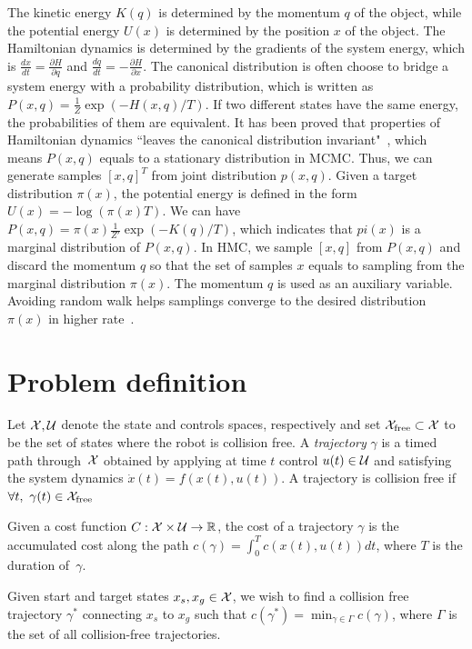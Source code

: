 \documentclass[letterpaper, 10 pt, conference]{ieeeconf}  %
\begin{document}
{The kinetic energy $ K(q) $ is determined by the momentum $ q $ of the object, while the potential energy $ U(x) $ is determined by the position $ x $ of the object.
The Hamiltonian dynamics is determined by the gradients of the system energy, which is
$ \frac{dx}{dt} = \frac{\partial H}{\partial q} $ and $ \frac{dq}{dt} = - \frac{\partial H}{\partial x} $.
%
The canonical distribution is often choose to bridge a system energy with a probability distribution, which is written as $ P(x, q) = \frac{1}{Z} \exp ( -H(x,q) / T ) $.
If two different states have the same energy, the probabilities of them are equivalent.
It has been proved that properties of Hamiltonian dynamics ``leaves the canonical distribution invariant"~\cite{N11}, which means $ P(x, q) $ equals to a stationary distribution in MCMC.
Thus, we can generate samples $ [ x , q ]^T $ from joint distribution $ p(x, q) $.
%
Given a target distribution $ \pi(x) $, the potential energy is defined in the form $  U(x) = - \log ( \pi(x) T ) $.
We can have $ P(x, q) = \pi(x) \frac{1}{Z'} \exp ( -K(q) / T ) $, which indicates that $ pi(x) $ is a marginal distribution of $ P(x, q) $.
In HMC, we sample $ [ x ,q ] $ from $ P(x, q) $ and discard the momentum $ q $ so that the set of samples $ x $ equals to sampling from the marginal distribution $ \pi(x) $.
The momentum $ q $ is used as an auxiliary variable.
Avoiding random walk helps samplings converge to the desired distribution $ \pi(x) $ in higher rate~\cite{N11}.
%
}

\section{Problem definition}
\label{sec:algorithm}
Let $\mathcal{X}, \mathcal{U}$ denote the state and controls spaces, respectively and set $\mathcal{X}_{\rm free} \subset \mathcal{X}$ to be the set of states where the robot is collision free.
A \emph{trajectory} $\gamma$ is a timed path through~$\mathcal{X}$ obtained by applying at time $t$ control $u(t) \in \mathcal{U}$ and satisfying the system dynamics 
$\dot{x}(t) = f( x(t) , u(t) )$.
A trajectory is collision free if $\forall t,~\gamma(t) \in \mathcal{X}_{\rm free}$

Given a cost function $C : \mathcal{X} \times \mathcal{U} \rightarrow \mathbb{R}$, the cost of a trajectory $ \gamma $ is the accumulated cost along the path
$c(\gamma) = \int_0^{T} c( x(t), u(t) ) dt$, 
where $T$ is the duration of~$\gamma$.

Given start and target states $x_s, x_g \in \mathcal{X}$, we wish to find a collision free trajectory $\gamma^*$ connecting $x_s$ to $x_g$ such that 
$c(\gamma^*) = \min_{\gamma \in \Gamma} c(\gamma)$, where $\Gamma$ is the set of all collision-free trajectories.
\end{document}
